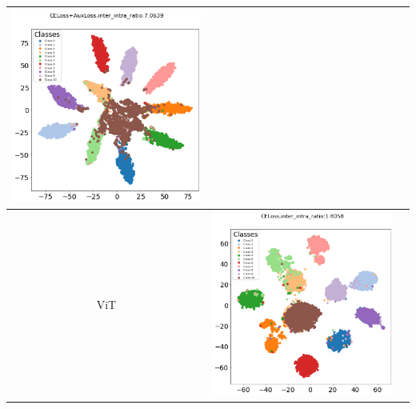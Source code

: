 \begin{table}[H]
\begin{tabular}{|c|c|c|}
\begin{minipage}{0.45\textwidth} \centering \includegraphics[width=\textwidth]{assets/resnet50_tsne_feature_c.png} \end{minipage} \\ \hline
\begin{minipage}{0.1\textwidth} \centering ViT \end{minipage} & 
\begin{minipage}{0.45\textwidth} \centering \includegraphics[width=\textwidth]{assets/vit_tsne_feature.png} \end{minipage} & 

\end{tabular}
\end{table}
